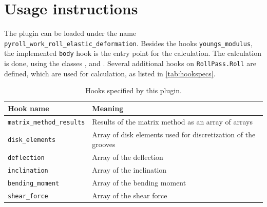 \documentclass[11pt]{PyRollDocs}
\begin{document}
    \section{Usage instructions}\label{sec:usage-instructions}

    The plugin can be loaded under the name \texttt{pyroll\_work\_roll\_elastic\_deformation}.
    Besides the hooks \lstinline{youngs_modulus}, the implemented \lstinline{body} hook is the entry point for the calculation.
    The calculation is done, using the classes ,  and .
    Several additional hooks on \lstinline{RollPass.Roll} are defined, which are used for calculation, as listed in \autoref{tab:hookspecs}.

    \begin{table}
        \centering
        \caption{Hooks specified by this plugin.}
        \label{tab:hookspecs}
        \begin{tabular}{ll}
            \toprule
            Hook name                        & Meaning                                                       \\
            \midrule
            \texttt{matrix\_method\_results} & Results of the matrix method as an array of arrays            \\
            \texttt{disk\_elements}          & Array of disk elements used for discretization of the grooves \\
            \texttt{deflection}              & Array of the deflection                                       \\
            \texttt{inclination}             & Array of the inclination                                      \\
            \texttt{bending\_moment}         & Array of the bending moment                                   \\
            \texttt{shear\_force}            & Array of the shear force                                      \\


            \bottomrule
        \end{tabular}
    \end{table}

    \printbibliography
\end{document}
